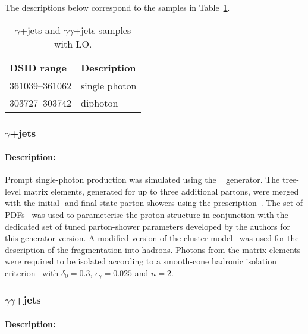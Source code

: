 The descriptions below correspond to the samples in Table~\ref{tab:gammajets-sherpa-lo}.

\begin{table}[!htbp]
  \caption{$\gamma$+jets and  $\gamma\gamma$+jets samples with \SHERPA LO\@.}%
  \label{tab:gammajets-sherpa-lo}
  \centering
  \begin{tabular}{l l}
    \toprule
    DSID range & Description \\
    \midrule
    361039--361062 & single photon \\
    303727--303742 & diphoton \\
    \bottomrule
  \end{tabular}
\end{table}


\subsubsection[y+jets]{$\gamma$+jets}

\paragraph{Description:}

Prompt single-photon production was simulated using the \SHERPA[2.1]~\cite{Bothmann:2019yzt}
generator. The tree-level matrix elements, generated for up to three
additional partons, were merged with the initial- and final-state parton showers using the
\MEPSatLO prescription~\cite{Hoeche:2009rj}. The \CT[10nlo] set of PDFs~\cite{Lai:2010vv} was
used to parameterise the proton structure in conjunction with the dedicated set of tuned
parton-shower parameters developed by the \SHERPA authors for this generator version. A
modified version of the cluster model~\cite{Winter:2003tt} was used
for the description of the fragmentation into hadrons. Photons from the matrix elements were
required to be isolated according to a smooth-cone hadronic isolation criterion~\cite{Frixione:1998jh}
with $\delta_0=0.3$, $\epsilon_{\gamma}=0.025$ and $n=2$.


\subsubsection[yy+jets]{ $\gamma\gamma$+jets}

\paragraph{Description:}

